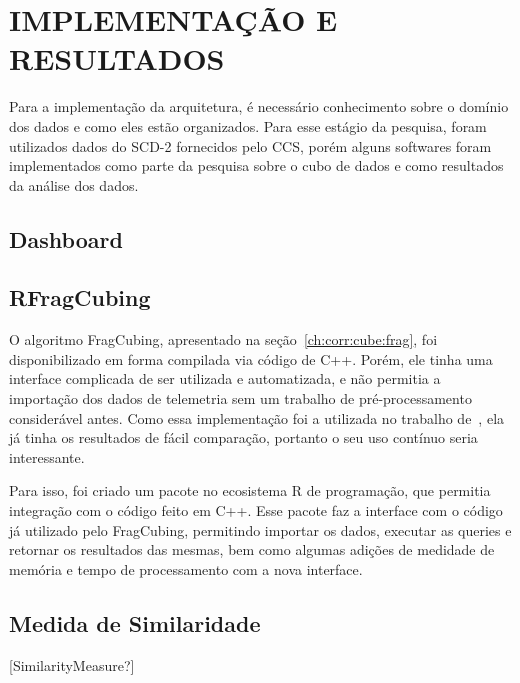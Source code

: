 
\chapter{IMPLEMENTAÇÃO E RESULTADOS}
\label{ch:impl}

Para a implementação da arquitetura, é necessário conhecimento sobre o domínio dos dados e como eles estão organizados. Para esse estágio da pesquisa, foram utilizados dados do SCD-2 fornecidos pelo CCS, porém alguns softwares foram implementados como parte da pesquisa sobre o cubo de dados e como resultados da análise dos dados.

\section{Dashboard}
\label{ch:impl:dash}

\section{RFragCubing}
\label{ch:impl:rfrag}

O algoritmo FragCubing, apresentado na seção~\ref{ch:corr:cube:frag}, foi disponibilizado em forma compilada via código de C++. Porém, ele tinha uma interface complicada de ser utilizada e automatizada, e não permitia a importação dos dados de telemetria sem um trabalho de pré-processamento considerável antes. Como essa implementação foi a utilizada no trabalho de~\cite{silva:2015:abordagensParaCubo}, ela já tinha os resultados de fácil comparação, portanto o seu uso contínuo seria interessante.

Para isso, foi criado um pacote no ecosistema R de programação, que permitia integração com o código feito em C++. Esse pacote faz a interface com o código já utilizado pelo FragCubing, permitindo importar os dados, executar as queries e retornar os resultados das mesmas, bem como algumas adições de medidade de memória e tempo de processamento com a nova interface.

\section{Medida de Similaridade}
\label{ch:impl:similarity}

[SimilarityMeasure?]

